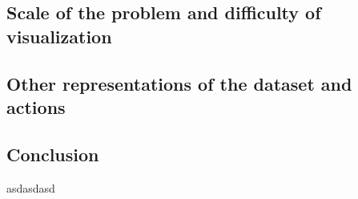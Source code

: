 \documentclass[12pt]{article}
\begin{document}
	\subsection{Scale of the problem and difficulty of visualization}
	

	
	\subsection{Other representations of the dataset and actions}
	
	
	
	\subsection{Conclusion}



\begin{thebibliography}{99}
\singlespacing

 asdasdasd

\end{thebibliography}
\end{document}
